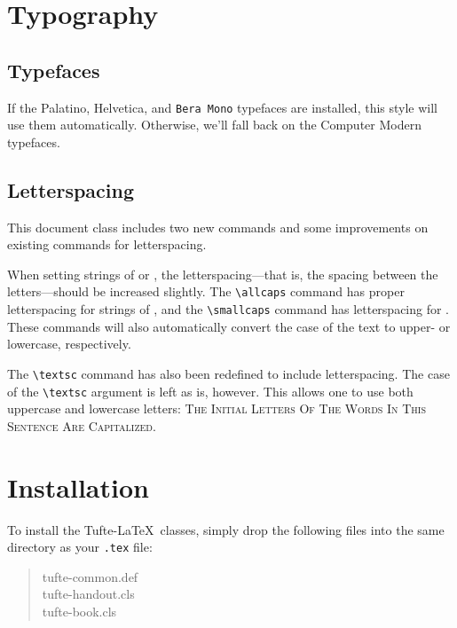 \documentclass{tufte-handout}
\begin{document}
\begin{fullwidth}
\small\itshape\lipsum[1]
\end{fullwidth}

\section{Typography}\label{sec:typography}

\subsection{Typefaces}\label{sec:typefaces}
If the Palatino, \textsf{Helvetica}, and \texttt{Bera Mono} typefaces are installed, this style
will use them automatically.  Otherwise, we'll fall back on the Computer Modern
typefaces.

\subsection{Letterspacing}\label{sec:letterspacing}
This document class includes two new commands and some improvements on
existing commands for letterspacing.

When setting strings of  or , the
letter\-spacing---that is, the spacing between the letters---should be
increased slightly.\cite{Bringhurst2005}  The \Verb|\allcaps| command has proper letterspacing for
strings of , and the \Verb|\smallcaps| command
has letterspacing for .  These commands
will also automatically convert the case of the text to upper- or
lowercase, respectively.

The \Verb|\textsc| command has also been redefined to include
letterspacing.  The case of the \Verb|\textsc| argument is left as is,
however.  This allows one to use both uppercase and lowercase letters:
\textsc{The Initial Letters Of The Words In This Sentence Are Capitalized.}



\section{Installation}\label{sec:installation}
To install the Tufte-\LaTeX\ classes, simply drop the
following files into the same directory as your \texttt{.tex}
file:
\begin{quote}
  \ttfamily
  tufte-common.def\\
  tufte-handout.cls\\
  tufte-book.cls
\end{quote}
\end{document}
